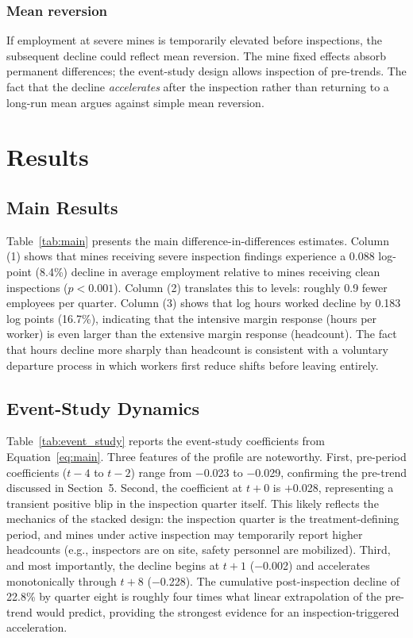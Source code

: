 \documentclass[12pt]{article}
\begin{document}
\subsubsection*{Mean reversion} If employment at severe mines is temporarily elevated before inspections, the subsequent decline could reflect mean reversion. The mine fixed effects absorb permanent differences; the event-study design allows inspection of pre-trends. The fact that the decline \textit{accelerates} after the inspection rather than returning to a long-run mean argues against simple mean reversion.


\section{Results}

\subsection{Main Results}



Table~\ref{tab:main} presents the main difference-in-differences estimates. Column (1) shows that mines receiving severe inspection findings experience a 0.088 log-point (8.4\%) decline in average employment relative to mines receiving clean inspections ($p < 0.001$). Column (2) translates this to levels: roughly 0.9 fewer employees per quarter. Column (3) shows that log hours worked decline by 0.183 log points (16.7\%), indicating that the intensive margin response (hours per worker) is even larger than the extensive margin response (headcount). The fact that hours decline more sharply than headcount is consistent with a voluntary departure process in which workers first reduce shifts before leaving entirely.

\subsection{Event-Study Dynamics}



Table~\ref{tab:event_study} reports the event-study coefficients from Equation~\eqref{eq:main}. Three features of the profile are noteworthy. First, pre-period coefficients ($t-4$ to $t-2$) range from $-$0.023 to $-$0.029, confirming the pre-trend discussed in Section~5. Second, the coefficient at $t+0$ is $+$0.028, representing a transient positive blip in the inspection quarter itself. This likely reflects the mechanics of the stacked design: the inspection quarter is the treatment-defining period, and mines under active inspection may temporarily report higher headcounts (e.g., inspectors are on site, safety personnel are mobilized). Third, and most importantly, the decline begins at $t+1$ ($-$0.002) and accelerates monotonically through $t+8$ ($-$0.228). The cumulative post-inspection decline of 22.8\% by quarter eight is roughly four times what linear extrapolation of the pre-trend would predict, providing the strongest evidence for an inspection-triggered acceleration.
\end{document}
